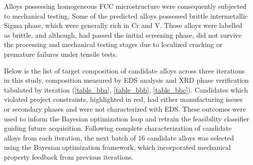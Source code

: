 Alloys possessing homogeneous FCC microstructure were consequently subjected to mechanical testing. Some of the predicted alloys possessed brittle intermetallic Sigma phase, which were generally rich in Cr and V. Those alloys were labelled as brittle, and although, had passed the initial screening phase, did not survive the processing and mechanical testing stages due to localized cracking or premature failures under tensile tests.     



Below is the list of target composition of candidate alloys across three iterations in this study, composition measured by EDS analysis and XRD phase verification tabulated by iteration (\autoref{table_bba}, \autoref{table_bbb}, \autoref{table_bbc}). Candidates which violated project constraints, highlighted in red, had either manufacturing issues or secondary phases and were not characterized with EDS. These outcomes were used to inform the Bayesian optimization loop and retrain the feasibility classifier guiding future acquisition. Following complete characterization of candidate alloys from each iteration, the next batch of 16 candidate alloys was selected using the Bayesian optimization framework, which incorporated mechanical property feedback from previous iterations.

